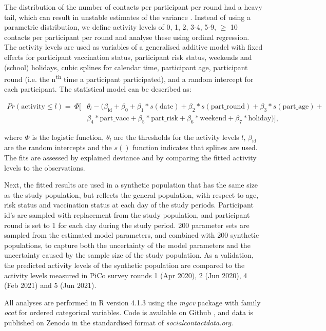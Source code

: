 \documentclass[fleqn,10pt]{wlscirep}
\begin{document}
The distribution of the number of contacts per participant per round had a heavy tail, which can result in unstable estimates of the variance \cite{Tagore_2015}. Instead of using a parametric distribution, we define activity levels of 0, 1, 2, 3-4, 5-9, $\geq$ 10 contacts per participant per round and analyse these using ordinal regression. The activity levels are used as variables of a generalised additive model with fixed effects for participant vaccination status, participant risk status, weekends and (school) holidays, cubic splines for calendar time, participant age, participant round (i.e. the n\textsuperscript{th} time a participant participated), and a random intercept for each participant. The statistical model can be described as:

\begin{align*}
Pr(\mathrm{activity} \leq l) = \: \Phi[ & \theta_l - (\beta_\mathrm{id} + \beta_0 + \beta_1 * s(\mathrm{date}) + \beta_2 * s(\mathrm{part\_round}) + \beta_3 * s(\mathrm{part\_age}) + \\
& \beta_4 * \mathrm{part\_vacc} + \beta_5 * \mathrm{part\_risk} + \beta_6 * \mathrm{weekend} + \beta_7 * \mathrm{holiday})],
\end{align*}

where $\Phi$ is the logistic function, $\theta_l$ are the thresholds for the activity levels $l$, $\beta_\mathrm{id}$ are the random intercepts and the $s()$ function indicates that splines are used. The fits are assessed by explained deviance and by comparing the fitted activity levels to the observations. 

Next, the fitted results are used in a synthetic population that has the same size as the study population, but reflects the general population, with respect to age\cite{CBS_2021}, risk status\cite{Nivel_2021} and vaccination status\cite{RIVM_2022} at each day of the study periods. Participant id's are sampled with replacement from the study population, and participant round is set to 1 for each day during the study period. 200 parameter sets are sampled from the estimated model parameters, and combined with 200 synthetic populations, to capture both the uncertainty of the model parameters and the uncertainty caused by the sample size of the study population. As a validation, the predicted activity levels of the synthetic population are compared to the activity levels measured in PiCo survey rounds 1 (Apr 2020), 2 (Jun 2020), 4 (Feb 2021) and 5 (Jun 2021).

All analyses are performed in R version 4.1.3 \cite{R_2022} using the \textit{mgcv} package \cite{Wood_2017} with family \textit{ocat} for ordered categorical variables. Code is available on Github \cite{Github_RIVM}, and data is published on Zenodo \cite{Zenodo_2022} in the standardised format of \textit{socialcontactdata.org}.
\end{document}
